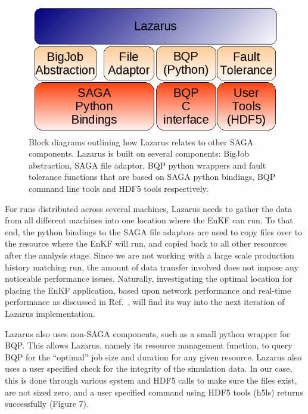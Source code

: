 \documentclass{sig-alternate}
\newcommand{\up}{\vspace*{-0.3em}}
\begin{document}
\begin{figure} 
  \begin{center} \includegraphics[scale=0.5]{./figures/Architecture.png} \caption{Block diagrams outlining how Lazarus relates to other SAGA components. Lazarus is built on several components: BigJob abstraction, SAGA file adaptor, BQP python wrappers and fault tolerance functions that are based on SAGA python bindings, BQP command line tools and HDF5 tools respectively.}\label{fig:application_architecture}
\up\up\up\up\up\up\up%
\end{center}
\end{figure}
 
For runs distributed across several machines, Lazarus needs to gather the data from all different machines into one location where the EnKF can run. To that end, the python bindings to the SAGA file adaptors are used to copy files over to the resource where the EnKF will run, and copied back to all other resources after the analysis stage. Since we are not working with a large scale production history matching run, the amount of data transfer involved does not impose any noticeable performance issues. Naturally, investigating the optimal location for placing the EnKF application, based upon network performance and real-time performance as discussed in Ref.~\cite{escience07}, will find its way into the next iteration of Lazarus implementation.

Lazarus also uses non-SAGA components, such as a small python wrapper
for BQP. This allows Lazarus, namely its resource management function,
to query BQP for the ``optimal'' job size and duration for any given
resource. Lazarus also uses a user specified check for the integrity
of the simulation data. In our case, this is done through various
system and HDF5 calls to make sure the files exist, are not sized
zero, and a user specified command using HDF5 tools (h5ls) returns
successfully (Figure 7).
\end{document}
